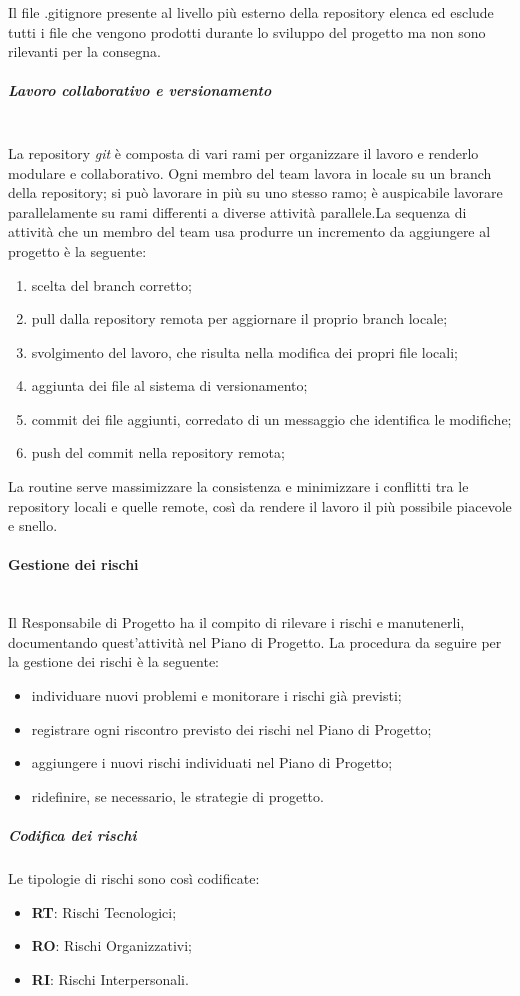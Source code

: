 			Il file .gitignore presente al livello più esterno della repository elenca ed esclude tutti i file che vengono prodotti durante lo sviluppo del progetto ma non sono rilevanti per la consegna.
			\subparagraph{Lavoro collaborativo e versionamento} \mbox{}\\
			La repository \textit{git} è composta di vari rami per organizzare il lavoro e renderlo modulare e collaborativo. Ogni membro del team lavora in locale su un branch della repository; si può lavorare in più su uno stesso ramo; è auspicabile lavorare parallelamente su rami differenti a diverse attività parallele.\newline La sequenza di attività che un membro del team usa produrre un incremento da aggiungere al progetto è la seguente:
			\begin{enumerate}
				\item scelta del branch corretto;
				\item pull dalla repository remota per aggiornare il proprio branch locale;
				\item svolgimento del lavoro, che risulta nella modifica dei propri file locali;
				\item aggiunta dei file al sistema di versionamento;
				\item commit dei file aggiunti, corredato di un messaggio che identifica le modifiche;
				\item push del commit nella repository remota;
			\end{enumerate}
			La routine serve massimizzare la consistenza e minimizzare i conflitti tra le repository locali e quelle remote, così da rendere il lavoro il più possibile piacevole e snello.
			\paragraph{Gestione dei rischi} \mbox{}\\
			Il Responsabile di Progetto ha il compito di rilevare i rischi e manutenerli, documentando quest'attività nel Piano di Progetto. La procedura da seguire per la gestione dei rischi è la seguente:
			\begin{itemize}
				\item individuare nuovi problemi e monitorare i rischi già previsti;
				\item registrare ogni riscontro previsto dei rischi nel Piano di Progetto;
				\item aggiungere i nuovi rischi individuati nel Piano di Progetto;
				\item ridefinire, se necessario, le strategie di progetto.
			\end{itemize}
				\subparagraph{Codifica dei rischi}
				Le tipologie di rischi sono così codificate:
				\begin{itemize}
					\item \textbf{RT}: Rischi Tecnologici;
					\item \textbf{RO}: Rischi Organizzativi;
					\item \textbf{RI}: Rischi Interpersonali.
				\end{itemize}
